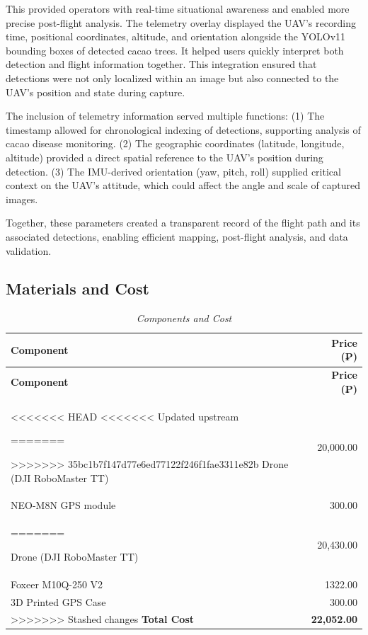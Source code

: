 This provided operators with real-time situational awareness and enabled more precise post-flight analysis. The telemetry overlay displayed the UAV’s recording time, positional coordinates, altitude, and orientation alongside the YOLOv11 bounding boxes of detected cacao trees. It helped users quickly interpret both detection and flight information together. This integration ensured that detections were not only localized within an image but also connected to the UAV’s position and state during capture.

The inclusion of telemetry information served multiple functions:
(1) The timestamp allowed for chronological indexing of detections, supporting analysis of cacao disease monitoring.
(2) The geographic coordinates (latitude, longitude, altitude) provided a direct spatial reference to the UAV’s position during detection.
(3) The IMU-derived orientation (yaw, pitch, roll) supplied critical context on the UAV’s attitude, which could affect the angle and scale of captured images.

Together, these parameters created a transparent record of the flight path and its associated detections, enabling efficient mapping, post-flight analysis, and data validation.

\subsection{Materials and Cost}

\begin{longtable}{p{8cm} r}
	\caption{\textit{Components and Cost}} \label{tab:components} \\
	
	\toprule
	\textbf{Component}        & \textbf{Price (₱)}                \\
	\midrule
	\endfirsthead
	
	\toprule
	\textbf{Component}        & \textbf{Price (₱)}                \\
	\midrule
	\endhead
	
	\bottomrule
	\endfoot
<<<<<<< HEAD
<<<<<<< Updated upstream

=======
	
>>>>>>> 35bc1b7f147d77e6ed77122f246f1fae3311e82b
	Drone (DJI RoboMaster TT) & 20,000.00                         \\
	NEO-M8N GPS module        & 300.00                            \\
=======
	
	Drone (DJI RoboMaster TT) & 20,430.00                         \\
	Foxeer M10Q-250 V2        & 1322.00                            \\
	3D Printed GPS Case        & 300.00                            \\
>>>>>>> Stashed changes
	\midrule
	\textbf{Total Cost}       & \textbf{22,052.00}                \\
\end{longtable}


